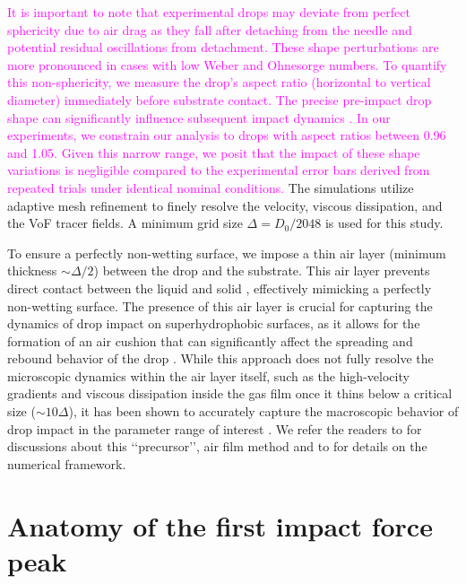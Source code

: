 \documentclass{jfm}
\newcommand{\Rev}[1]{\todo[color=orange, bordercolor=none, textcolor=white]{R2}\textcolor{magenta}{#1}}
\begin{document}
\Rev{It is important to note that experimental drops may deviate from perfect sphericity due to air drag as they fall after detaching from the needle and potential residual oscillations from detachment. These shape perturbations are more pronounced in cases with low Weber and Ohnesorge numbers. To quantify this non-sphericity, we measure the drop's aspect ratio (horizontal to vertical diameter) immediately before substrate contact. The precise pre-impact drop shape can significantly influence subsequent impact dynamics \citep{thoraval-2013-jfm, yun2017bouncing,Zhang2019}. In our experiments, we constrain our analysis to drops with aspect ratios between 0.96 and 1.05. Given this narrow range, we posit that the impact of these shape variations is negligible compared to the experimental error bars derived from repeated trials under identical nominal conditions.}
The simulations utilize adaptive mesh refinement to finely resolve the velocity, viscous dissipation, and the VoF tracer fields. A minimum grid size $\Delta = D_0/2048$ is used for this study. 

To ensure a perfectly non-wetting surface, we impose a thin air layer (minimum thickness $\sim \Delta/2$) between the drop and the substrate. This air layer prevents direct contact between the liquid and solid \citep{kolinski-2014-epl, sprittles2024gas}, effectively mimicking a perfectly non-wetting surface. The presence of this air layer is crucial for capturing the dynamics of drop impact on superhydrophobic surfaces, as it allows for the formation of an air cushion that can significantly affect the spreading and rebound behavior of the drop \citep{ramirez2020lifting, sanjay_chantelot_lohse_2023}.
While this approach does not fully resolve the microscopic dynamics within the air layer itself, such as the high-velocity gradients and viscous dissipation inside the gas film once it thins below a critical size ($\sim 10\Delta$), it has been shown to accurately capture the macroscopic behavior of drop impact in the parameter range of interest \citep{ramirez2020lifting, sanjay2023drop, alventosa2023inertio, garcia2024skating}. We refer the readers to \citet{VatsalThesis} for discussions about this \lq\lq precursor\rq\rq, air film method and to \citet{popinet-basilisk, basiliskVatsal, zhang2022impact} for details on the numerical framework.

\section{Anatomy of the first impact force peak}\label{sec:FirstPeak}
\end{document}
